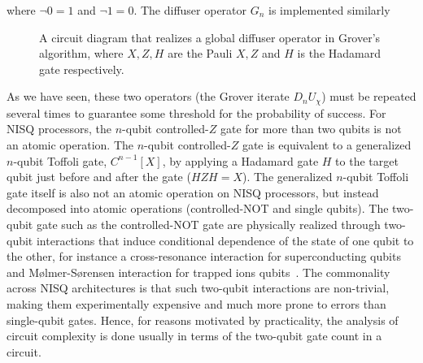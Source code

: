 \noindent
where $\neg 0 = 1$ and $\neg 1 = 0$.  The diffuser operator $G_n$ is implemented similarly

\begin{figure}[h]
    \centering
    \caption[A circuit diagram that realizes a global diffuser operator in Grover's algorithm.]{A circuit diagram that realizes a global diffuser operator in Grover's algorithm, where $X, Z, H$ are the Pauli $X,Z$ and $H$ is the Hadamard gate respectively.}
\end{figure}

\noindent
 As we have seen, these two operators (the Grover iterate $D_{n}U_{\chi}$) must be repeated several times to guarantee some threshold for the probability of success. For \acs{NISQ} processors, the $n$-qubit controlled-$Z$ gate for more than two qubits is not an atomic operation. The $n$-qubit controlled-$Z$ gate is equivalent to a generalized $n$-qubit Toffoli gate, $C^{n-1}[X]$, by applying a Hadamard gate $H$ to the target qubit just before and after the gate (\ie $HZH = X$). The generalized $n$-qubit Toffoli gate itself is also not an atomic operation on \acs{NISQ} processors, but instead decomposed into atomic operations (controlled-NOT and single qubits). The two-qubit gate such as the controlled-NOT gate are physically realized through two-qubit interactions that induce conditional dependence of the state of one qubit to the other, for instance a cross-resonance interaction for superconducting qubits~\cite{Kjaergaard_2020} and Mølmer-Sørensen interaction for trapped ions qubits~\cite{Bruzewicz_2019}. The commonality across \acs{NISQ} architectures is that such two-qubit interactions are non-trivial, making them experimentally expensive and much more prone to errors than single-qubit gates. Hence, for reasons motivated by practicality, the analysis of circuit complexity is done usually in terms of the two-qubit gate count in a circuit.

